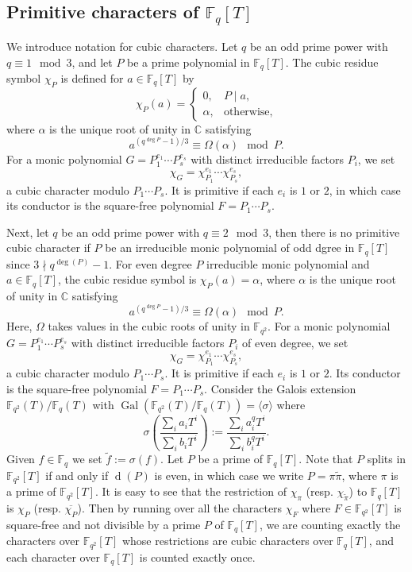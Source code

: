 \documentclass[table]{amsart}
\newcommand{\F}{\mathbb{F}}
\newcommand{\op}[1]{\operatorname{#1}}
\numberwithin{equation}{section}
\begin{document}
\subsection{Primitive characters of $\F_q[T]$}\label{section 2.5}
\par We introduce notation for cubic characters. Let \( q \) be an odd prime power with \( q \equiv 1 \mod 3 \), and let \( P \) be a prime polynomial in \( \mathbb{F}_q[T] \). The cubic residue symbol \( \chi_P \) is defined for \( a \in \mathbb{F}_q[T] \) by  
\[
\chi_P(a) = \begin{cases}  
0, & P \mid a, \\  
\alpha, & \text{otherwise},  
\end{cases}  
\]
where \( \alpha \) is the unique root of unity in \( \mathbb{C} \) satisfying  
\[
a^{(q^{\deg P} - 1)/3} \equiv \Omega(\alpha )\mod P.
\]  
For a monic polynomial \( G = P_1^{e_1} \cdots P_s^{e_s} \) with distinct irreducible factors \( P_i \), we set  
\[
\chi_G = \chi_{P_1}^{e_1} \cdots \chi_{P_s}^{e_s},
\]
a cubic character modulo \( P_1 \cdots P_s \). It is primitive if each \( e_i \) is \( 1 \) or \( 2 \), in which case its conductor is the square-free polynomial \( F = P_1 \cdots P_s \). 
\par Next, let \( q \) be an odd prime power with \( q \equiv 2 \mod 3 \), then there is no primitive cubic character if \( P \) be an irreducible monic polynomial  of odd dgree in \( \mathbb{F}_q[T] \) since \(3\nmid q^{\op{deg}(P)}-1\). For even degree \( P \)  irreducible monic polynomial and \( a \in \mathbb{F}_q[T] \), the cubic residue symbol  is  
\(\chi_P(a) = \alpha \), where \( \alpha \) is the unique root of unity in \( \mathbb{C} \) satisfying  
\[
a^{(q^{\deg P} - 1)/3} \equiv \Omega(\alpha) \mod P.
\] 
Here, $\Omega$ takes values in the cubic roots of unity in \(\mathbb{F}_{q^2}\). For a monic polynomial \( G = P_1^{e_1} \cdots P_s^{e_s} \) with distinct irreducible factors \( P_i \) of even degree, we set  
\[
\chi_G = \chi_{P_1}^{e_1} \cdots \chi_{P_s}^{e_s},
\]
a cubic character modulo \( P_1 \cdots P_s \). It is primitive if each \( e_i \) is \( 1 \) or \( 2 \). Its conductor is the square-free polynomial \( F=  P_1 \cdots P_s \). Consider the Galois extension $\F_{q^2}(T)/\F_q(T)$ with $\op{Gal}\left(\F_{q^2}(T)/\F_q(T)\right)=\langle \sigma\rangle$ where \begin{equation}\label{sigma defn}\sigma\left(\frac{\sum_{i} a_i T^i}{\sum_{i} b_i T^i}\right):=\frac{\sum_{i} a_i^q T^i}{\sum_{i} b_i^q T^i}.\end{equation} Given $f\in \F_q$ we set $\tilde{f}:=\sigma(f)$. Let $P$ be a prime of $\F_q[T]$. Note that $P$ splits in $\F_{q^2}[T]$ if and only if $\op{d}(P)$ is even, in which case we write $P=\pi \widetilde{\pi}$, where $\pi$ is a prime of $\F_{q^2}[T]$. It is easy to see that the restriction of $\chi_{\pi}$ (resp. $\chi_{\tilde{\pi}}$) to $\F_q[T]$ is $\chi_P$ (resp. $\overline{\chi_P}$). Then by running over all the characters $\chi_{F}$ where $F \in \mathbb{F}_{q^{2}}[T]$ is square-free and not divisible by a prime $P$ of $\mathbb{F}_{q}[T]$, we are counting exactly the characters over $\mathbb{F}_{q^{2}}[T]$ whose restrictions are cubic characters over $\mathbb{F}_{q}[T]$, and each character over $\mathbb{F}_{q}[T]$ is counted exactly once.
\end{document}
